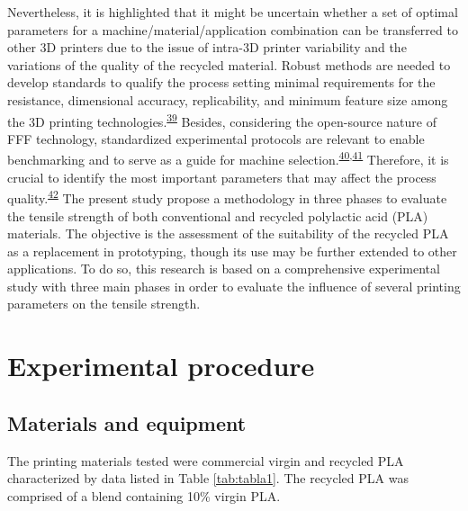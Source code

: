 \documentclass[
  12pt]{article}
\begin{document}
Nevertheless, it is highlighted that it might be uncertain whether a set of optimal parameters for a machine/material/application combination can be transferred to other 3D printers due to the issue of intra-3D printer variability and the variations of the quality of the recycled material.
Robust methods are needed to develop standards to qualify the process setting minimal requirements for the resistance, dimensional accuracy, replicability, and minimum feature size among the 3D printing technologies.\textsuperscript{\protect\hyperlink{ref-Rebaioli2017}{39}}
Besides, considering the open-source nature of FFF technology, standardized experimental protocols are relevant to enable benchmarking and to serve as a guide for machine selection.\textsuperscript{\protect\hyperlink{ref-CruzSanchez2014}{40},\protect\hyperlink{ref-Roberson2013}{41}}
Therefore, it is crucial to identify the most important parameters that may affect the process quality.\textsuperscript{\protect\hyperlink{ref-JaisinghSheoran2019}{42}}
The present study propose a methodology in three phases to evaluate the tensile strength of both conventional and recycled polylactic acid (PLA) materials. The objective is the assessment of the suitability of the recycled PLA as a replacement in prototyping, though its use may be further extended to other applications. To do so, this research is based on a comprehensive experimental study with three main phases in order to evaluate the influence of several printing parameters on the tensile strength.

\hypertarget{section:experimental}{%
\section{Experimental procedure}\label{section:experimental}}

\hypertarget{materials-and-equipment}{%
\subsection{Materials and equipment}\label{materials-and-equipment}}

The printing materials tested were commercial virgin and recycled PLA characterized by data listed in Table \ref{tab:tabla1}.
The recycled PLA was comprised of a blend containing 10\% virgin PLA.

\providecommand{\docline}[3]{\noalign{\global\setlength{\arrayrulewidth}{#1}}\arrayrulecolor[HTML]{#2}\cline{#3}}

\setlength{\tabcolsep}{2pt}
\end{document}
